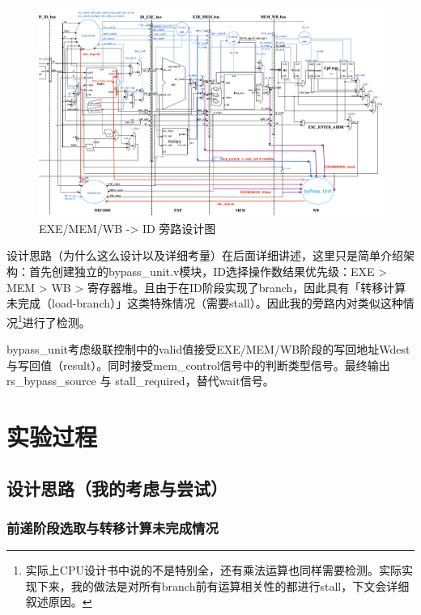 \documentclass[a4paper]{article}
\begin{document}
\begin{figure}[H]
    \hspace*{-0.9cm} %
    \includegraphics[width=1.1\linewidth]{img/旁路修改图片/旁路设计图.png}
    \caption{EXE/MEM/WB -> ID 旁路设计图}
\end{figure}

设计思路（为什么这么设计以及详细考量）在后面详细讲述，这里只是简单介绍架构：首先创建独立的bypass\_unit.v模块，ID选择操作数结果优先级：EXE > MEM > WB > 寄存器堆。且由于在ID阶段实现了branch，因此具有「转移计算未完成（load-branch）」这类特殊情况（需要stall）。因此我的旁路内对类似这种情况\footnote{实际上CPU设计书中说的不是特别全，还有乘法运算也同样需要检测。实际实现下来，我的做法是对所有branch前有运算相关性的都进行stall，下文会详细叙述原因。}进行了检测。

bypass\_unit考虑级联控制中的valid值接受EXE/MEM/WB阶段的写回地址Wdest与写回值（result）。同时接受mem\_control信号中的判断类型信号。最终输出rs\_bypass\_source 与 stall\_required，替代wait信号。

\newpage


\section{实验过程}

\subsection{设计思路（我的考虑与尝试）}

\subsubsection{前递阶段选取与转移计算未完成情况}
\end{document}
